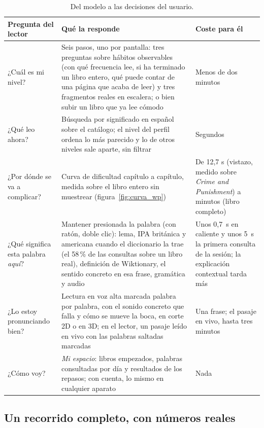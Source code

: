 \documentclass[11pt,a4paper]{article}
\newcommand{\pct}{\,\%}
\begin{document}
\begin{table}[htbp]
\centering
\small
\begin{tabularx}{\textwidth}{@{}L{3.6cm} Y L{3.2cm}@{}}
\toprule
\textbf{Pregunta del lector} & \textbf{Qué la responde} & \textbf{Coste para él} \\
\midrule
¿Cuál es mi nivel? & Seis pasos, uno por pantalla: tres preguntas sobre hábitos observables (con qué frecuencia lee, si ha terminado un libro entero, qué puede contar de una página que acaba de leer) y tres fragmentos reales en escalera; o bien subir un libro que ya lee cómodo & Menos de dos minutos \\
\addlinespace
¿Qué leo ahora? & Búsqueda por significado en español sobre el catálogo; el nivel del perfil ordena lo más parecido y lo de otros niveles sale aparte, sin filtrar & Segundos \\
\addlinespace
¿Por dónde se va a complicar? & Curva de dificultad capítulo a capítulo, medida sobre el libro entero sin muestrear (figura~\ref{fig:curva_wp}) & De 12,7 s (vistazo, medido sobre \emph{Crime and Punishment}) a minutos (libro completo) \\
\addlinespace
¿Qué significa esta palabra \emph{aquí}? & Mantener presionada la palabra (con ratón, doble clic): lema, IPA británica y americana cuando el diccionario la trae (el 58\pct{} de las consultas sobre un libro real), definición de Wiktionary, el sentido concreto en esa frase, gramática y audio & Unos 0,7~s en caliente y unos 5~s la primera consulta de la sesión; la explicación contextual tarda más \\
\addlinespace
¿Lo estoy pronunciando bien? & Lectura en voz alta marcada palabra por palabra, con el sonido concreto que falla y cómo se mueve la boca, en corte 2D o en 3D; en el lector, un pasaje leído en vivo con las palabras saltadas marcadas & Una frase; el pasaje en vivo, hasta tres minutos \\
\addlinespace
¿Cómo voy? & \emph{Mi espacio}: libros empezados, palabras consultadas por día y resultados de los repasos; con cuenta, lo mismo en cualquier aparato & Nada \\
\bottomrule
\end{tabularx}
\caption{Del modelo a las decisiones del usuario.}
\label{cuad:decisiones_lector}
\end{table}

\subsection{Un recorrido completo, con números reales}
\label{sec:recorrido}
\end{document}
